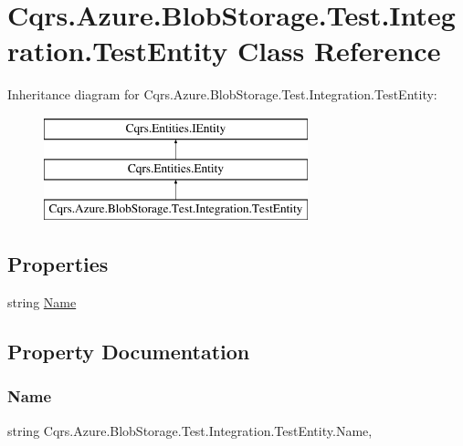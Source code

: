 \hypertarget{classCqrs_1_1Azure_1_1BlobStorage_1_1Test_1_1Integration_1_1TestEntity}{}\section{Cqrs.\+Azure.\+Blob\+Storage.\+Test.\+Integration.\+Test\+Entity Class Reference}
\label{classCqrs_1_1Azure_1_1BlobStorage_1_1Test_1_1Integration_1_1TestEntity}
Inheritance diagram for Cqrs.\+Azure.\+Blob\+Storage.\+Test.\+Integration.\+Test\+Entity\+:\begin{figure}[H]
\begin{center}
\leavevmode
\includegraphics[height=3.000000cm]{classCqrs_1_1Azure_1_1BlobStorage_1_1Test_1_1Integration_1_1TestEntity}
\end{center}
\end{figure}
\subsection*{Properties}
\begin{DoxyCompactItemize}
\item 
string \hyperlink{classCqrs_1_1Azure_1_1BlobStorage_1_1Test_1_1Integration_1_1TestEntity_aad584f6a6399f936b17e6367ebf30b3d}{Name}
\end{DoxyCompactItemize}


\subsection{Property Documentation}
\mbox{\label{classCqrs_1_1Azure_1_1BlobStorage_1_1Test_1_1Integration_1_1TestEntity_aad584f6a6399f936b17e6367ebf30b3d}} 
\subsubsection{\texorpdfstring{Name}{Name}}
{\footnotesize\ttfamily string Cqrs.\+Azure.\+Blob\+Storage.\+Test.\+Integration.\+Test\+Entity.\+Name\hspace{0.3cm}{\ttfamily [get]}, {\ttfamily [set]}}

